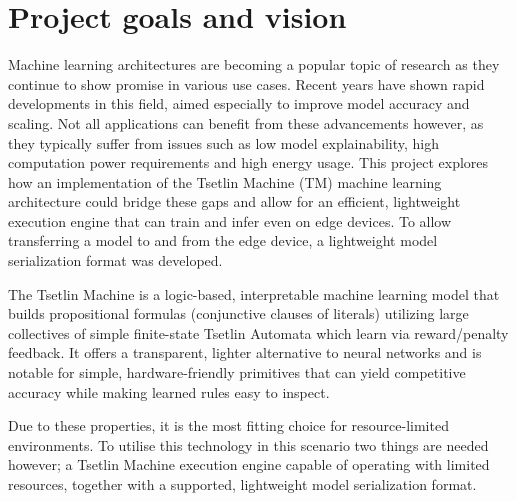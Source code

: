 \documentclass[english]{aghengthesis} %
\author{Robert Mesek, Igor Sikora}
\date{\the\year}
\begin{document}
\maketitle

\tableofcontents

\chapter{Project goals and vision}
\label{chap:goals-vision}


\vspace{10pt}
Machine learning architectures are becoming a popular topic of research as they continue to show promise in various use cases. Recent years have shown rapid developments in this field, aimed especially to improve model accuracy and scaling. Not all applications can benefit from these advancements however, as they typically suffer from issues such as low model explainability, high computation power requirements and high energy usage. This project explores how an implementation of the Tsetlin Machine (TM) machine learning architecture could bridge these gaps and allow for an efficient, lightweight execution engine that can train and infer even on edge devices. To allow transferring a model to and from the edge device, a lightweight model serialization format was developed.

\vspace{10pt}
The Tsetlin Machine is a logic-based, interpretable machine learning model that builds propositional formulas (conjunctive clauses of literals) utilizing large collectives of simple finite-state Tsetlin Automata which learn via reward/penalty feedback. It offers a transparent, lighter alternative to neural networks and is notable for simple, hardware-friendly primitives that can yield competitive accuracy while making learned rules easy to inspect. 

\vspace{10pt}
Due to these properties, it is the most fitting choice for resource-limited environments. To utilise this technology in this scenario two things are needed however; a Tsetlin Machine execution engine capable of operating with limited resources, together with a supported, lightweight model serialization format.
\end{document}
